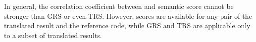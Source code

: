 In general, the correlation coefficient between {\model} and semantic score cannot be 
stronger than GRS or even TRS. However, {\model} scores are available for any pair 
of the translated result and the reference code, while GRS and TRS are applicable only to 
a subset of translated results. 
%




